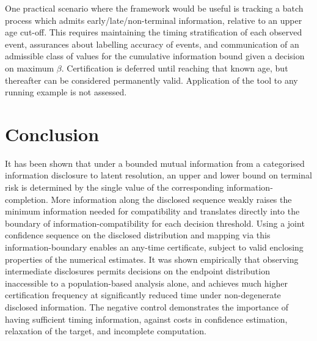 One practical scenario where the framework would be useful is tracking a batch process which admits early/late/non-terminal information, relative to an upper age cut-off. This requires maintaining the timing stratification of each observed event, assurances about labelling accuracy of events, and communication of an admissible class of values for the cumulative information bound given a decision on maximum $\beta$. Certification is deferred until reaching that known age, but thereafter can be considered permanently valid. Application of the tool to any running example is not assessed.

\section{Conclusion}\label{sec:conclusion} 
It has been shown that under a bounded mutual information from a categorised information disclosure to latent resolution, an upper and lower bound on terminal risk is determined by the single value of the corresponding information-completion. More information along the disclosed sequence weakly raises the minimum information needed for compatibility and translates directly into the boundary of information-compatibility for each decision threshold. Using a joint confidence sequence on the disclosed distribution and mapping via this information-boundary enables an any-time certificate, subject to valid enclosing properties of the numerical estimates. It was shown empirically that observing intermediate disclosures permits decisions on the endpoint distribution inaccessible to a population-based analysis alone, and achieves much higher certification frequency at significantly reduced time under non-degenerate disclosed information. The negative control demonstrates the importance of having sufficient timing information, against costs in confidence estimation, relaxation of the target, and incomplete computation.
